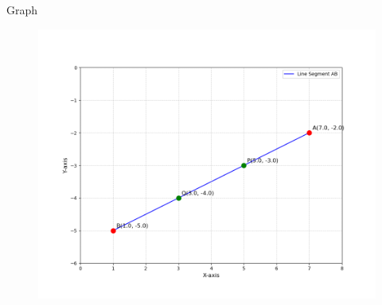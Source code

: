 \documentclass{beamer}
\begin{document}
\begin{frame}{Graph}
    \begin{figure}
        \centering
        \includegraphics[width=0.9\columnwidth]{figs/trisection_diagram.png}
    \end{figure}
\end{frame}
\end{document}
